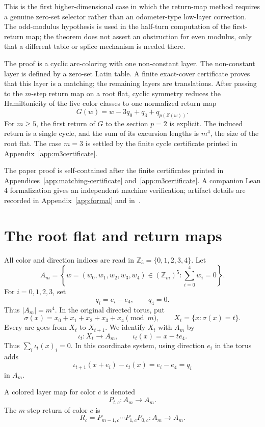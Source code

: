 \documentclass[11pt]{article}
\theoremstyle{definition}
\newcommand{\Zfive}{\mathbb Z_5}
\begin{document}
This is the first higher-dimensional case in which the return-map method requires a genuine zero-set
selector rather than an odometer-type low-layer correction.  The odd-modulus hypothesis is used in the
half-turn computation of the first-return map; the theorem does not assert an obstruction for even
modulus, only that a different table or splice mechanism is needed there.

The proof is a cyclic arc-coloring with one non-constant layer.  The non-constant layer is defined
by a zero-set Latin table.  A finite exact-cover certificate proves that this layer is a matching;
the remaining layers are translations.  After passing to the \(m\)-step return map on a root flat,
cyclic symmetry reduces the Hamiltonicity of the five color classes to one normalized return map
\[
G(w)=w-3q_0+q_3+q_{p(Z(w))}.
\]
For \(m\ge5\), the first return of \(G\) to the section \(p=2\) is explicit.  The induced return is a
single cycle, and the sum of its excursion lengths is \(m^4\), the size of the root flat.  The case
\(m=3\) is settled by the finite cycle certificate printed in Appendix~\ref{app:m3certificate}.

The paper proof is self-contained after the finite certificates printed in Appendices~\ref{app:matching-certificate} and~\ref{app:m3certificate}.  A companion Lean 4 formalization gives an independent machine verification; artifact details are recorded in Appendix~\ref{app:formal} and in~\cite{D5OddLean}.


\section{The root flat and return maps}\label{sec:root-return}


All color and direction indices are read in \(\Zfive=\{0,1,2,3,4\}\).  Let
\[
A_m=\left\{w=(w_0,w_1,w_2,w_3,w_4)\in(\mathbb Z_m)^5:\sum_{i=0}^4 w_i=0\right\}.
\]
For \(i=0,1,2,3\), set
\[
q_i=e_i-e_4,\qquad q_4=0.
\]
Thus \(|A_m|=m^4\).  In the original directed torus, put
\[
\sigma(x)=x_0+x_1+x_2+x_3+x_4\pmod m,
\qquad X_t=\{x:\sigma(x)=t\}.
\]
Every arc goes from \(X_t\) to \(X_{t+1}\).  We identify \(X_t\) with \(A_m\) by
\[
\iota_t:X_t\longrightarrow A_m,\qquad \iota_t(x)=x-t e_4.
\]
Thus \(\sum_i \iota_t(x)_i=0\).  In this coordinate system, using direction \(e_i\) in the torus adds
\[
\iota_{t+1}(x+e_i)-\iota_t(x)=e_i-e_4=q_i
\]
in \(A_m\).

A colored layer map for color \(c\) is denoted
\[
P_{t,c}:A_m\to A_m.
\]
The \(m\)-step return of color \(c\) is
\[
R_c=P_{m-1,c}\cdots P_{1,c}P_{0,c}:A_m\to A_m.
\]
\end{document}
